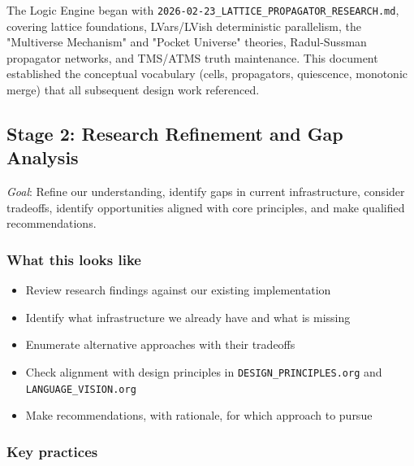 \documentclass[11pt]{article}
\begin{document}
The Logic Engine began with \texttt{2026-02-23\_LATTICE\_PROPAGATOR\_RESEARCH.md},
covering lattice foundations, LVars/LVish deterministic parallelism, the
"Multiverse Mechanism" and "Pocket Universe" theories, Radul-Sussman
propagator networks, and TMS/ATMS truth maintenance. This document
established the conceptual vocabulary (cells, propagators, quiescence,
monotonic merge) that all subsequent design work referenced.
\subsection{Stage 2: Research Refinement and Gap Analysis}
\label{sec:org286b5a1}

\emph{Goal}: Refine our understanding, identify gaps in current infrastructure,
consider tradeoffs, identify opportunities aligned with core principles,
and make qualified recommendations.
\subsubsection{What this looks like}
\label{sec:org162a3db}

\begin{itemize}
\item Review research findings against our existing implementation
\item Identify what infrastructure we already have and what is missing
\item Enumerate alternative approaches with their tradeoffs
\item Check alignment with design principles in \texttt{DESIGN\_PRINCIPLES.org} and
\texttt{LANGUAGE\_VISION.org}
\item Make recommendations, with rationale, for which approach to pursue
\end{itemize}
\subsubsection{Key practices}
\label{sec:org0cdb1ad}
\end{document}
